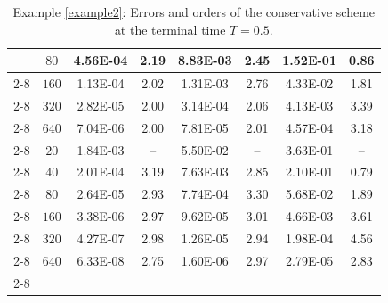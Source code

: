 \documentclass[11pt]{article}
\numberwithin{equation}{section}
\begin{document}
\begin{table}[!ht]
\begin{tabular}{|c|c|cc|cc|cc|}
& $   80$ &    4.56E-04&     2.19  &    8.83E-03&     2.45	 &    1.52E-01&     0.86   \\ \cline{2-8}
& $  160$ &    1.13E-04&     2.02  &    1.31E-03&     2.76	 &    4.33E-02&     1.81   \\ \cline{2-8}
& $  320$ &    2.82E-05&     2.00  &    3.14E-04&     2.06	 &    4.13E-03&     3.39   \\ \cline{2-8}
& $  640$ &    7.04E-06&     2.00  &    7.81E-05&     2.01	 &    4.57E-04&     3.18   \\ \cline{2-8} \hline
\multirow{6}{0.6cm}{$\mathcal{P}_3$}& $   20$ &    1.84E-03&     --    &    5.50E-02&     --     &    3.63E-01&     --    \\ \cline{2-8}
& $   40$ &    2.01E-04&     3.19  &    7.63E-03&     2.85	 &    2.10E-01&     0.79  \\ \cline{2-8}
& $   80$ &    2.64E-05&     2.93  &    7.74E-04&     3.30	 &    5.68E-02&     1.89  \\ \cline{2-8}
& $  160$ &    3.38E-06&     2.97  &    9.62E-05&     3.01	 &    4.66E-03&     3.61  \\ \cline{2-8}
& $  320$ &    4.27E-07&     2.98  &    1.26E-05&     2.94	 &    1.98E-04&     4.56  \\ \cline{2-8}
& $  640$ &    6.33E-08&     2.75  &    1.60E-06&     2.97	 &    2.79E-05&     2.83  \\ \cline{2-8} \hline
\end{tabular}

	\caption{ Example \ref{example2}: Errors and orders of the conservative scheme at the terminal time $T=0.5$. }\label{tab_ex2_tab_err1}

\end{table}
\end{document}
